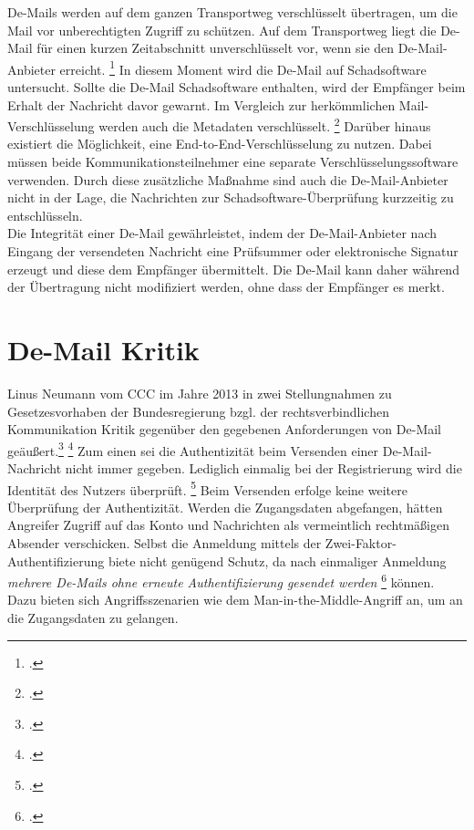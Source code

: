 \documentclass  [paper=a4,
				fontsize=12pt,
				listof=totoc,
				bibliography=totoc
				]{scrreprt}
\begin{document}
{			De-Mails werden auf dem ganzen Transportweg verschlüsselt übertragen, um die Mail vor unberechtigten Zugriff zu schützen.
			Auf dem Transportweg liegt die De-Mail für einen kurzen Zeitabschnitt unverschlüsselt vor, wenn sie den De-Mail-Anbieter erreicht. \footcite[Vgl.][S. 16]{BSIDeMail} 
			In diesem Moment wird die De-Mail auf Schadsoftware untersucht. Sollte die De-Mail Schadsoftware enthalten, wird der Empfänger beim Erhalt der Nachricht davor gewarnt.
			Im Vergleich zur herkömmlichen Mail-Verschlüsselung werden auch die Metadaten verschlüsselt. \footcite{BSIMerkmale}
			Darüber hinaus existiert die Möglichkeit, eine End-to-End-Verschlüsselung zu nutzen.
			Dabei müssen beide Kommunikationsteilnehmer eine separate Verschlüsselungssoftware verwenden. Durch diese zusätzliche Maßnahme sind auch die De-Mail-Anbieter nicht in der Lage, die Nachrichten zur Schadsoftware-Überprüfung kurzzeitig zu entschlüsseln.\medskip\\
			
			Die Integrität einer De-Mail gewährleistet, indem der De-Mail-Anbieter nach Eingang der versendeten Nachricht eine Prüfsummer oder elektronische Signatur erzeugt und diese dem Empfänger übermittelt.
			Die De-Mail kann daher während der Übertragung nicht modifiziert werden, ohne dass der Empfänger es merkt.
			
			\section{De-Mail Kritik}
			Linus Neumann vom \ac{CCC} im Jahre 2013 in zwei Stellungnahmen zu Gesetzesvorhaben der Bundesregierung bzgl. der rechtsverbindlichen Kommunikation Kritik gegenüber den gegebenen Anforderungen von De-Mail geäußert.\footcite{Neumann2013a} \footcite{Neumann2013b}
			Zum einen sei die Authentizität beim Versenden einer De-Mail-Nachricht nicht immer gegeben. Lediglich einmalig bei der Registrierung wird die Identität des Nutzers überprüft. \footcite{Neumann2013b} 
			Beim Versenden erfolge keine weitere Überprüfung der Authentizität.
			Werden die Zugangsdaten abgefangen, hätten Angreifer Zugriff auf das Konto und Nachrichten als vermeintlich rechtmäßigen Absender verschicken.
			Selbst die Anmeldung mittels der Zwei-Faktor-Authentifizierung biete nicht genügend Schutz, da nach einmaliger Anmeldung \textit{\glqq mehrere De-Mails ohne erneute Authentifizierung gesendet werden\grqq} \footcite[][o.S.]{Neumann2013b} können.
			Dazu bieten sich Angriffsszenarien wie dem Man-in-the-Middle-Angriff an, um an die Zugangsdaten zu gelangen.\medskip\\
			
}
\end{document}
